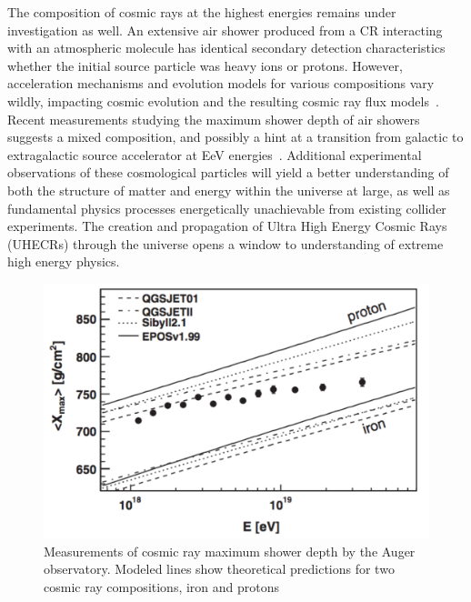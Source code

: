 	The composition of cosmic rays at the highest energies remains under investigation as well.  An extensive air shower produced from a CR interacting with an atmospheric molecule has identical secondary detection characteristics whether the initial source particle was heavy ions or protons.  However, acceleration mechanisms and evolution models for various compositions vary wildly, impacting cosmic evolution and the resulting cosmic ray flux models~\cite{UHECRcomposition}.  Recent measurements studying the maximum shower depth of air showers suggests a mixed composition, and possibly a hint at a transition from galactic to extragalactic source accelerator at EeV energies~\cite{AugerXmax}\cite{AugerXmaxDiscussion}. Additional experimental observations of these cosmological particles will yield a better understanding of both the structure of matter and energy within the universe at large, as well as fundamental physics processes energetically unachievable from existing collider experiments. The creation and propagation of Ultra High Energy Cosmic Rays (UHECRs) through the universe opens a window to understanding of extreme high energy physics.
	
	

		
\noindent
\begin{figure}
\centering
	\includegraphics[width=\textwidth]{figures/AugerXmax}
	\caption{Measurements of cosmic ray maximum shower depth by the Auger observatory.  Modeled lines show theoretical predictions for two cosmic ray compositions, iron and protons\cite{AugerXmax}}
	\label{fig:AugerXmax}
\end{figure}

